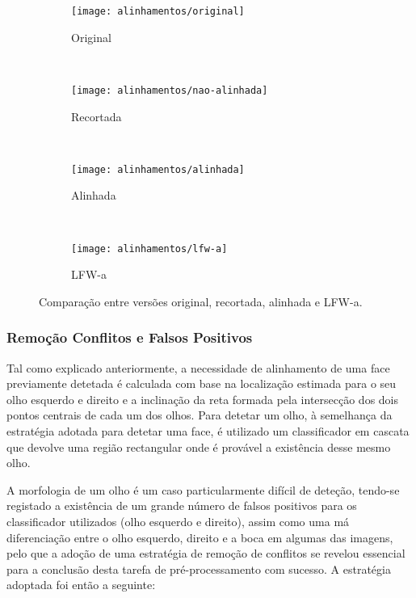 \begin{figure}[t]
        \centering
        \begin{subfigure}[b]{0.2\textwidth}
                \centering
                \texttt{[image: alinhamentos/original]}
                \caption{Original}
                \label{fig:alinha_original}
        \end{subfigure}%
        ~ 
        \begin{subfigure}[b]{0.2\textwidth}
                \centering
                \texttt{[image: alinhamentos/nao-alinhada]}
                \caption{Recortada}
                \label{fig:alinha_nao-alinhada}
        \end{subfigure}
        ~ 
        \begin{subfigure}[b]{0.2\textwidth}
                \centering
                \texttt{[image: alinhamentos/alinhada]}
                \caption{Alinhada}
                \label{fig:alinha_alinhada}
        \end{subfigure}
        ~ 
        \begin{subfigure}[b]{0.2\textwidth}
                \centering
                \texttt{[image: alinhamentos/lfw-a]}
                \caption{LFW-a}
                \label{fig:alinha_lfw-a}
        \end{subfigure}
        \caption{Comparação entre versões original, recortada, alinhada e LFW-a.}\label{fig:alinhamentos}
\end{figure}

\subsubsection*{Remoção Conflitos e Falsos Positivos}
Tal como explicado anteriormente, a necessidade de alinhamento de uma face previamente detetada é calculada com base na localização estimada para o seu olho esquerdo e direito e a inclinação da reta formada pela intersecção dos dois pontos centrais de cada um dos olhos. Para detetar um olho, à semelhança da estratégia adotada para detetar uma face, é utilizado um classificador em cascata que devolve uma região rectangular onde é provável a existência desse mesmo olho. 

A morfologia de um olho é um caso particularmente difícil de deteção, tendo-se registado a existência de um grande número de falsos positivos para os classificador utilizados (olho esquerdo e direito), assim como uma má diferenciação entre o olho esquerdo, direito e a boca em algumas das imagens, pelo que a adoção de uma estratégia de remoção de conflitos se revelou essencial para a conclusão desta tarefa de pré-processamento com sucesso. A estratégia adoptada foi então a seguinte:

